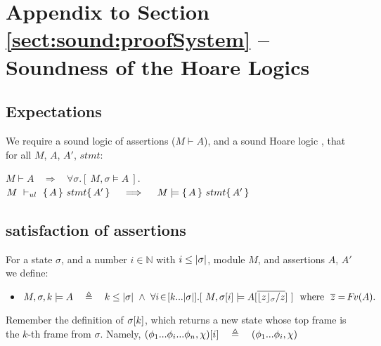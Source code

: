 \section{Appendix to Section \ref{sect:sound:proofSystem} -- Soundness of the Hoare Logics}

\subsection{Expectations}
\begin{axiom}
\label{lemma:axiom:enc:assert:ul}
\label{ax:ul:sound}
We require a sound logic of assertions ($M \vdash A$), and a sound Hoare logic , \ie that for all $M$, $A$, $A'$, $stmt$:
\begin{center}
$M \vdash A   \ \ \ \  \Longrightarrow  \ \ \ \  \forall \sigma.[\ M, \sigma \models A\ ]$.\\
%
%
{$M\ \vdash_{ul}\   \{\, A \, \}\ stmt \{\, A' \, \}  \ \ \ \  \Longrightarrow  \ \ \ \ M \models   \{\, A \, \}\ stmt \{\, A' \, \}$ }
 \end{center}
\end{axiom}

\subsection{\Scoped satisfaction of assertions}
\label{s:scoped:mean}

\begin{definition}%
\label{def:restrict}
For a state $\sigma$, and a number $i\in \mathbb{N}$ with $i \leq |\sigma|$,   module $M$, and assertions $A$, $A'$ we define: %
\begin{itemize}
\item
$  \satDAssertFrom M  \sigma k   A  \ \  \ \triangleq \  \ \  
  k\leq  \DepthSt {\sigma} \ \wedge \  \forall i\!\in\![k...\DepthSt {\sigma}].[\ M,{\RestictTo {\sigma}{i}} \models A[\overline{ {{\interpret \sigma z}/ z}}]\ ] \ \  \mbox{where} \ \
  \overline z=\fv(A).$ 
\end{itemize}
\end{definition}
 
 Remember the definition of  $\sigma[k]$, which returns a new state whose top frame is the $k$-th frame from $\sigma$. Namely, $\RestictTo {(\phi_1...\phi_i...\phi_n,\chi)} {i}\ \ \ \triangleq \ \ \ (\phi_1...\phi_i,\chi)$
  
